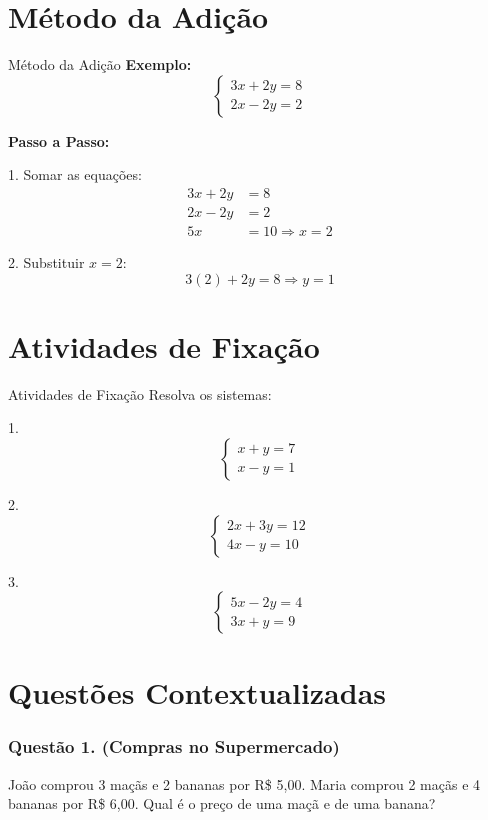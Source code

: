 \documentclass[12pt]{beamer}
\begin{document}
\section{Método da Adição}
\begin{frame}{Método da Adição}
\textbf{Exemplo:}
\[
\begin{cases}
3x + 2y = 8 \\
2x - 2y = 2
\end{cases}
\]

\textbf{Passo a Passo:}

1. Somar as equações:
\[
\begin{aligned}
3x + 2y &= 8 \\
2x - 2y &= 2 \\
\hline
5x &= 10 \Rightarrow x = 2
\end{aligned}
\]

2. Substituir \(x = 2\):
\[
3(2) + 2y = 8 \Rightarrow y = 1
\]
\end{frame}

\section{Atividades de Fixação}
\begin{frame}{Atividades de Fixação}
Resolva os sistemas:

1. 
\[
\begin{cases}
x + y = 7 \\
x - y = 1
\end{cases}
\]

2. 
\[
\begin{cases}
2x + 3y = 12 \\
4x - y = 10
\end{cases}
\]

3. 
\[
\begin{cases}
5x - 2y = 4 \\
3x + y = 9
\end{cases}
\]
\end{frame}

\section{Questões Contextualizadas}

\begin{frame}
\frametitle{Questão 1. (Compras no Supermercado)}
João comprou 3 maçãs e 2 bananas por R\$ 5,00. Maria comprou 2 maçãs e 4 bananas por R\$ 6,00. Qual é o preço de uma maçã e de uma banana?
\end{frame}
\end{document}
